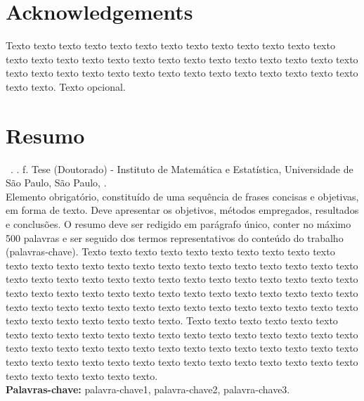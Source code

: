 \documentclass[11pt,twoside,a4paper]{book}
\begin{document}

\chapter*{Acknowledgements}
Texto texto texto texto texto texto texto texto texto texto texto texto texto
texto texto texto texto texto texto texto texto texto texto texto texto texto
texto texto texto texto texto texto texto texto texto texto texto texto texto
texto texto texto texto. Texto opcional.


\chapter*{Resumo}

\noindent \surnameAbbr~\textbf{\phdTitleBr}. 
\thesisYear. \thesisPages f. Tese (Doutorado) - Instituto de Matemática e Estatística,
Universidade de São Paulo, São Paulo, \thesisYear.
\\

Elemento obrigatório, constituído de uma sequência de frases concisas e
objetivas, em forma de texto.  Deve apresentar os objetivos, métodos empregados,
resultados e conclusões.  O resumo deve ser redigido em parágrafo único, conter
no máximo 500 palavras e ser seguido dos termos representativos do conteúdo do
trabalho (palavras-chave). 
Texto texto texto texto texto texto texto texto texto texto texto texto texto
texto texto texto texto texto texto texto texto texto texto texto texto texto
texto texto texto texto texto texto texto texto texto texto texto texto texto
texto texto texto texto texto texto texto texto texto texto texto texto texto
texto texto texto texto texto texto texto texto texto texto texto texto texto
texto texto texto texto texto texto texto texto.
Texto texto texto texto texto texto texto texto texto texto texto texto texto
texto texto texto texto texto texto texto texto texto texto texto texto texto
texto texto texto texto texto texto texto texto texto texto texto texto texto
texto texto texto texto texto texto texto texto texto texto texto texto texto
texto texto.
\\

\noindent \textbf{Palavras-chave:} palavra-chave1, palavra-chave2, palavra-chave3.
\end{document}
